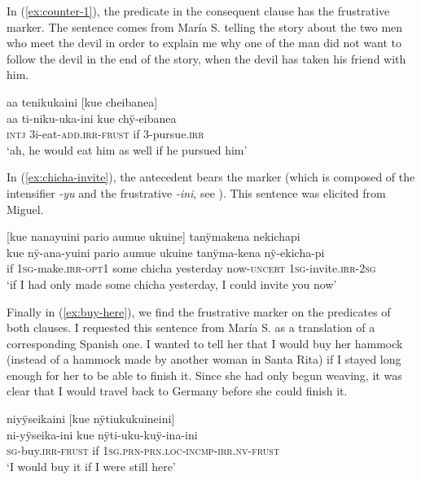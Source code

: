 In (\ref{ex:counter-1}), the predicate in the consequent clause has the frustrative marker. The sentence comes from María S. telling the story about the two men who meet the devil in order to explain me why one of the man did not want to follow the devil in the end of the story, when the devil has taken his friend with him.

\ea\label{ex:counter-1}
\begingl
\glpreamble aa tenikukaini \textup{[}kue cheibanea\textup{]}\\
\gla aa ti-niku-uka-ini kue chÿ-eibanea\\
\glb \textsc{intj} 3i-eat-\textsc{add.irr}-\textsc{frust} if 3-pursue.\textsc{irr}\\
\glft ‘ah, he would eat him as well if he pursued him’
\endgl
\trailingcitation{[rxx-n120511l-2.63-64]}
\xe

In (\ref{ex:chicha-invite}), the antecedent bears the  marker (which is composed of the intensifier \textit{-yu} and the frustrative \textit{-ini}, see ). This sentence was elicited from Miguel.

\newpage
\ea\label{ex:chicha-invite}
\begingl
\glpreamble \textup{[}kue nanayuini pario aumue ukuine\textup{]} tanÿmakena nekichapi \\
\gla kue nÿ-ana-yuini pario aumue ukuine tanÿma-kena nÿ-ekicha-pi \\
\glb if 1\textsc{sg}-make.\textsc{irr}-\textsc{opt}1 some chicha yesterday now-\textsc{uncert} 1\textsc{sg}-invite.\textsc{irr}-2\textsc{sg}\\
\glft ‘if I had only made some chicha yesterday, I could invite you now’
\endgl
\trailingcitation{[mxx-e160811sd.438]}
\xe


Finally in (\ref{ex:buy-here}), we find the frustrative marker on the predicates of both clauses. I requested this sentence from María S. as a translation of a corresponding Spanish one. I wanted to tell her that I would buy her hammock (instead of a hammock made by another woman in Santa Rita) if I stayed long enough for her to be able to finish it. Since she had only begun weaving, it was clear that I would travel back to Germany before she could finish it.

\ea\label{ex:buy-here}
\begingl
\glpreamble niyÿseikaini \textup{[}kue nÿtiukukuineini\textup{]}\\
\gla ni-yÿseika-ini kue nÿti-uku-kuÿ-ina-ini\\
\textsc{sg}-buy.\textsc{irr}-\textsc{frust} if 1\textsc{sg.prn}-\textsc{prn.loc}-\textsc{incmp}-\textsc{irr.nv}-\textsc{frust}\\
\glft ‘I would buy it if I were still here’
\endgl
\trailingcitation{[rxx-e181022le]}
\xe
{}

